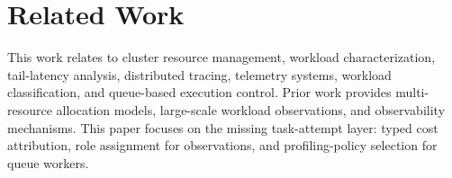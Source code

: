 \section{Related Work}
\label{sec:related-work}

This work relates to cluster resource management, workload characterization,
tail-latency analysis, distributed tracing, telemetry systems, workload
classification, and queue-based execution control. Prior work provides
multi-resource allocation models, large-scale workload observations, and
observability mechanisms. This paper focuses on the missing task-attempt layer:
typed cost attribution, role assignment for observations, and profiling-policy
selection for queue workers.
